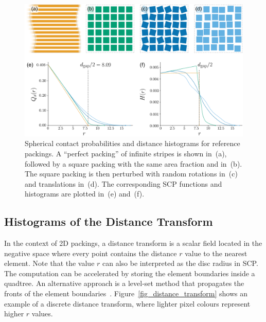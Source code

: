 \begin{figure}[h]
\centering
\includegraphics[width=1.0\textwidth]{figures/metrics/hsr_viz_big.pdf}
\caption[Spherical contact probabilities and distance histograms \newline for reference packings]
{\label{hsr_viz}
Spherical contact probabilities and distance histograms for 
reference packings.
A ``perfect packing'' of infinite stripes is shown in~(a),
followed by a square packing with the same area fraction and 
in~(b).  The square packing is then perturbed with random rotations in~(c)
and translations in~(d). The corresponding SCP functions and histograms are plotted
in~(e) and~(f).}
\end{figure}


\subsection{Histograms of the Distance Transform}




\newtext
{
In the context of 2D packings, a distance transform is a scalar field located in the negative space where every point
contains the distance $r$ value to the nearest  element.
Note that the value $r$ can also be interpreted as the disc radius in SCP.
The computation can be accelerated by storing the element boundaries inside a quadtree.
An alternative approach is a level-set method that propagates the fronts of the element boundaries~\cite{Osher1988}.
Figure~\ref{fig_distance_transform} shows an example of a discrete distance transform,
where lighter pixel colours represent higher $r$ values.
}

